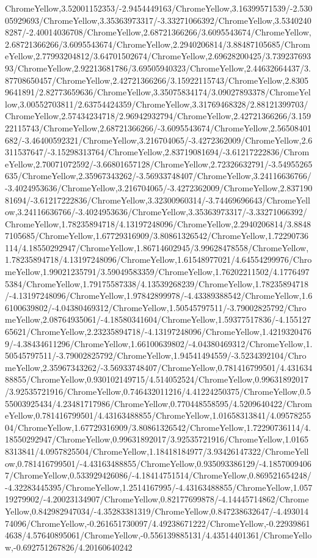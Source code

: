 {\begin{tikzternal}
ChromeYellow,3.52001152353/-2.9454449163/ChromeYellow,3.16399571539/-2.53005929693/ChromeYellow,3.35363973317/-3.33271066392/ChromeYellow,3.53402408287/-2.40014036708/ChromeYellow,2.68721366266/3.6095543674/ChromeYellow,2.68721366266/3.6095543674/ChromeYellow,2.2940206814/3.88487105685/ChromeYellow,2.77993204812/3.64701502674/ChromeYellow,2.69628200425/3.73923769393/ChromeYellow,2.92213681786/3.69505940323/ChromeYellow,2.44632664437/3.87708650457/ChromeYellow,2.42721366266/3.15922115743/ChromeYellow,2.83059641891/2.82773659636/ChromeYellow,3.35075834174/3.09027893378/ChromeYellow,3.00552703811/2.63754424359/ChromeYellow,3.31769468328/2.88121399703/ChromeYellow,2.57434234718/2.96942932794/ChromeYellow,2.42721366266/3.15922115743/ChromeYellow,2.68721366266/-3.6095543674/ChromeYellow,2.56508401682/-3.46400592321/ChromeYellow,3.216704065/-3.4272362009/ChromeYellow,2.6311537647/-3.15298313764/ChromeYellow,2.83719081694/-3.61217222836/ChromeYellow,2.70071072592/-3.66801657128/ChromeYellow,2.72326632791/-3.54955265635/ChromeYellow,2.35967343262/-3.56933748407/ChromeYellow,3.24116636766/-3.4024953636/ChromeYellow,3.216704065/-3.4272362009/ChromeYellow,2.83719081694/-3.61217222836/ChromeYellow,3.32300960314/-3.74469696643/ChromeYellow,3.24116636766/-3.4024953636/ChromeYellow,3.35363973317/-3.33271066392/ChromeYellow,1.78235894718/4.13197248096/ChromeYellow,2.2940206814/3.88487105685/ChromeYellow,1.67729316909/3.80861326542/ChromeYellow,1.72290736114/4.18550292947/ChromeYellow,1.86714602945/3.99628478558/ChromeYellow,1.78235894718/4.13197248096/ChromeYellow,1.61548977021/4.64554299976/ChromeYellow,1.99021235791/3.59049583359/ChromeYellow,1.76202211502/4.17764975384/ChromeYellow,1.79175587338/4.13539268239/ChromeYellow,1.78235894718/-4.13197248096/ChromeYellow,1.97842899978/-4.43389388542/ChromeYellow,1.66100639802/-4.04380469312/ChromeYellow,1.50545797511/-3.79002825792/ChromeYellow,2.08764935061/-4.18580341604/ChromeYellow,1.59377517836/-4.15512765621/ChromeYellow,2.23235894718/-4.13197248096/ChromeYellow,1.42193204769/-4.38434611296/ChromeYellow,1.66100639802/-4.04380469312/ChromeYellow,1.50545797511/-3.79002825792/ChromeYellow,1.94541494559/-3.5234392104/ChromeYellow,2.35967343262/-3.56933748407/ChromeYellow,0.781416799501/4.43163488855/ChromeYellow,0.930102149715/4.514052524/ChromeYellow,0.99631892017/3.92535721916/ChromeYellow,0.746432011216/4.41224250375/ChromeYellow,0.555003925434/4.23481717986/ChromeYellow,0.770448558595/4.5209640422/ChromeYellow,0.781416799501/4.43163488855/ChromeYellow,1.01658313841/4.0957825504/ChromeYellow,1.67729316909/3.80861326542/ChromeYellow,1.72290736114/4.18550292947/ChromeYellow,0.99631892017/3.92535721916/ChromeYellow,1.01658313841/4.0957825504/ChromeYellow,1.18418184977/3.93426147322/ChromeYellow,0.781416799501/-4.43163488855/ChromeYellow,0.935093386129/-4.18570094067/ChromeYellow,0.533929426086/-4.18414751514/ChromeYellow,0.869521654248/-4.32283445395/ChromeYellow,1.2514167995/-4.43163488855/ChromeYellow,1.05719279902/-4.20023134907/ChromeYellow,0.82177699878/-4.14445714862/ChromeYellow,0.842982947034/-4.35283381319/ChromeYellow,0.847238632647/-4.49301474096/ChromeYellow,-0.261651730097/4.49238671222/ChromeYellow,-0.229398614638/4.57640895061/ChromeYellow,-0.556139885131/4.43514401361/ChromeYellow,-0.692751267826/4.20160640242
\end{tikzternal}}

